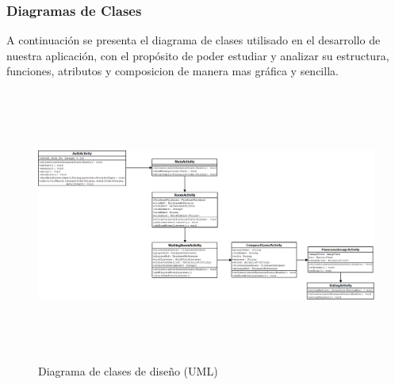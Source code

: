 \documentclass[12pt]{article}
\begin{document}
\subsubsection{Diagramas de Clases}
A continuación se presenta el diagrama de clases utilisado en el desarrollo de nuestra aplicación, con el propósito de poder estudiar y analizar su estructura, funciones, atributos y composicion de manera mas gráfica y sencilla.

\begin{figure}[H]
	\includegraphics[width=16cm, height=9cm]{imgs/uml_isw.png}
	\caption{Diagrama de clases de diseño (UML)}
\end{figure}
\newpage
\end{document}
